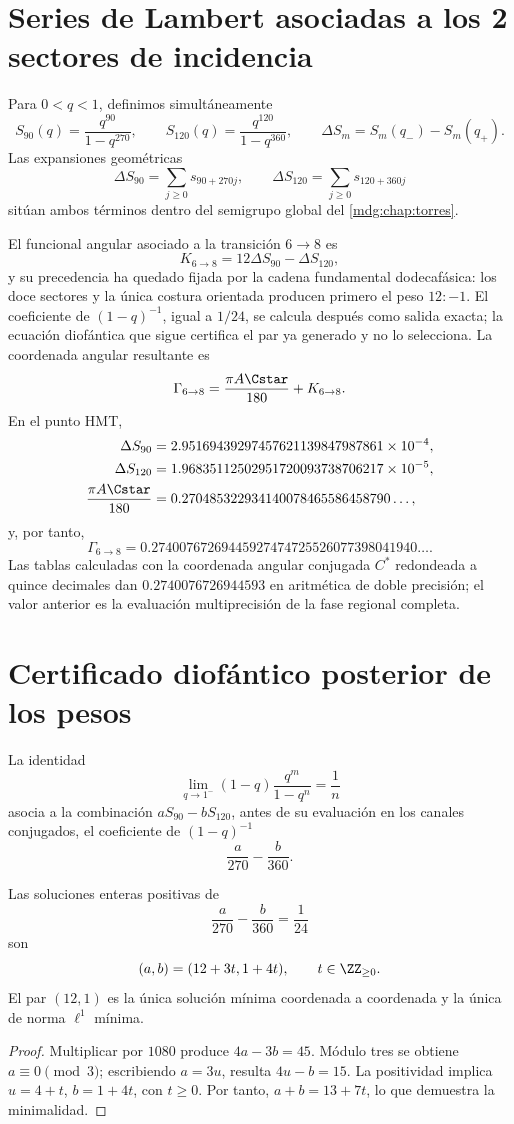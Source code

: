 \section{Series de Lambert asociadas a los 2 sectores de incidencia}

Para \(0<q<1\), definimos simultáneamente
\[
 S_{90}(q)=\frac{q^{90}}{1-q^{270}},
 \qquad
 S_{120}(q)=\frac{q^{120}}{1-q^{360}},
 \qquad
 \Delta S_m=S_m(q_-)-S_m(q_+).
\]
Las expansiones geométricas
\[
 \Delta S_{90}=\sum_{j\geq0}s_{90+270j},
 \qquad
 \Delta S_{120}=\sum_{j\geq0}s_{120+360j}
\]
sitúan ambos términos dentro del semigrupo global del
\cref{mdg:chap:torres}.

El funcional angular asociado a la transición \(6\to8\) es
\[
 K_{6\to8}=12\Delta S_{90}-\Delta S_{120},
\]
y su precedencia ha quedado fijada por la cadena fundamental dodecafásica:
los doce sectores y la única costura orientada producen primero el peso
\(12:-1\). El coeficiente de \((1-q)^{-1}\), igual a \(1/24\), se calcula después como salida exacta;
la ecuación diofántica que sigue certifica el par ya generado y no lo
selecciona.
La coordenada angular resultante es
\[
\Gamma_{6\to8}
=\frac{\pi A\Cstar}{180}+K_{6\to8}.
\]
En el punto HMT,
\[
\begin{aligned}
 \Delta S_{90}&=2.95169439297457621139847987861\times10^{-4},\\
 \Delta S_{120}&=1.96835112502951720093738706217\times10^{-5},\\
 \frac{\pi A\Cstar}{180}&=0.270485322934140078465586458790\ldots,
\end{aligned}
\]
y, por tanto,
\[
 \boxed{\Gamma_{6\to8}
 =0.27400767269445927474725526077398041940\ldots.}
\]
Las tablas calculadas con la coordenada angular conjugada \(C^*\) redondeada a quince decimales dan
\(0.2740076726944593\) en aritmética de doble precisión; el valor anterior
es la evaluación multiprecisión de la fase regional completa.

\section{Certificado diofántico posterior de los pesos}

La identidad
\[
 \lim_{q\to1^-}(1-q)\frac{q^m}{1-q^n}=\frac1n
\]
asocia a la combinación \(aS_{90}-bS_{120}\), antes de su evaluación
en los canales conjugados, el coeficiente de \((1-q)^{-1}\)
\[
 \frac a{270}-\frac b{360}.
\]

\begin{theorem}
Las soluciones enteras positivas de
\[
 \frac a{270}-\frac b{360}=\frac1{24}
\]
son
\[
 (a,b)=(12+3t,1+4t),\qquad t\in\ZZ_{\geq0}.
\]
El par \((12,1)\) es la única solución mínima coordenada a coordenada y la
única de norma \(\ell^1\) mínima.
\end{theorem}
\begin{proof}
Multiplicar por \(1080\) produce \(4a-3b=45\). Módulo tres se obtiene
\(a\equiv0\pmod3\); escribiendo \(a=3u\), resulta \(4u-b=15\). La
positividad implica \(u=4+t\), \(b=1+4t\), con \(t\geq0\). Por tanto,
\(a+b=13+7t\), lo que demuestra la minimalidad.
\end{proof}

